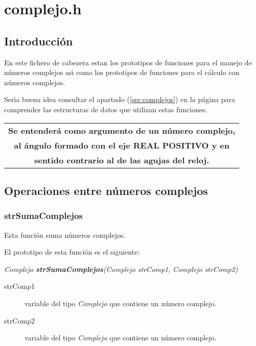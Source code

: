 %
%

\chapter{complejo.h}

\section{Introducci\'on}
En este fichero de cabezera estan los prototipos de funciones para el manejo
de n\'umeros complejos as\'{\i} como los prototipos de funciones para el
c\'alculo con n\'umeros complejos.\newline

Ser\'{\i}a buena idea consultar el apartado (\ref{sec:complejos}) en la
p\'agina \pageref{sec:complejos} para comprender las estructuras de datos
que utilizan estas funciones.

\begin{center}
\begin{tabular}{|c|}
\hline
\textbf{Se entender\'a como argumento de un n\'umero complejo,} \\
\textbf{al \'angulo formado con el eje REAL POSITIVO y en} \\
\textbf{sentido contrario al de las agujas del reloj.} \\
\hline
\end{tabular}
\end{center}

\newpage

\section{Operaciones entre n\'umeros complejos}

\subsection{strSumaComplejos}
Esta funci\'on suma n\'umeros complejos.\newline

El prototipo de esta funci\'on es el siguiente:

\begin{center}
\emph{Complejo \textbf{strSumaComplejos}(Complejo strComp1, Complejo strComp2)}
\end{center}

\begin{description}
\item[strComp1] variable del tipo \emph{Complejo} que contiene un n\'umero 
complejo.
\item[strComp2] variable del tipo \emph{Complejo} que contiene un n\'umero
complejo.
\end{description}


